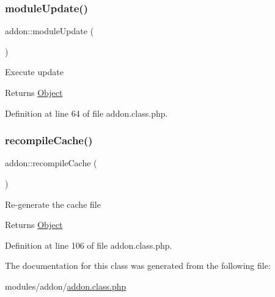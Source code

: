 \subsubsection{\texorpdfstring{module\+Update()}{moduleUpdate()}}
{\footnotesize\ttfamily addon\+::module\+Update (\begin{DoxyParamCaption}{ }\end{DoxyParamCaption})}

Execute update

\begin{DoxyReturn}{Returns}
\hyperlink{classObject}{Object} 
\end{DoxyReturn}


Definition at line 64 of file addon.\+class.\+php.

\mbox{\label{classaddon_ad2d70e001c5ec84c799e31c4fa761d9c}} 
\subsubsection{\texorpdfstring{recompile\+Cache()}{recompileCache()}}
{\footnotesize\ttfamily addon\+::recompile\+Cache (\begin{DoxyParamCaption}{ }\end{DoxyParamCaption})}

Re-\/generate the cache file

\begin{DoxyReturn}{Returns}
\hyperlink{classObject}{Object} 
\end{DoxyReturn}


Definition at line 106 of file addon.\+class.\+php.



The documentation for this class was generated from the following file\+:\begin{DoxyCompactItemize}
\item 
modules/addon/\hyperlink{addon_8class_8php}{addon.\+class.\+php}\end{DoxyCompactItemize}
